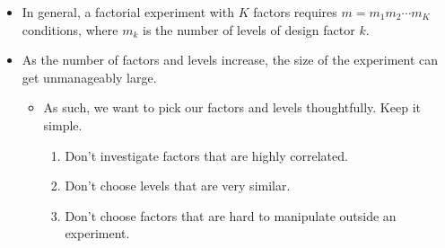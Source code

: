 \begin{itemize}
\begin{Example}{Button}{}
\begin{center}
                  \end{center}
            \end{Example}
      \item In general, a factorial experiment with $K$ factors requires $ m=m_1m_2\cdots m_K $ conditions, where $m_k$ is
            the number of levels of design factor $ k $.
      \item As the number of factors and levels increase, the size of the experiment can get unmanageably large.
            \begin{itemize}
                  \item As such, we want to pick our factors and levels thoughtfully. Keep it simple.
                        \begin{enumerate}[1.]
                              \item Don't investigate factors that are highly correlated.
                              \item Don't choose levels that are very similar.
                              \item Don't choose factors that are hard to manipulate outside an experiment.

\end{enumerate}
\end{itemize}
\end{itemize}
